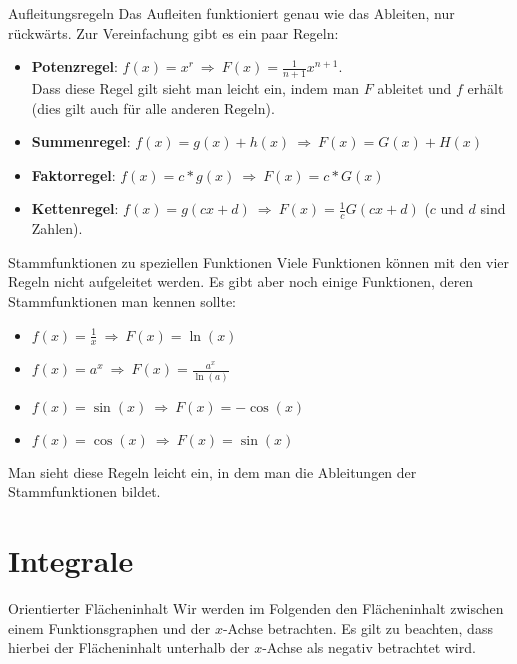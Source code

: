 \begin{bla}{Aufleitungsregeln}
  Das Aufleiten funktioniert genau wie das Ableiten, nur rückwärts. Zur Vereinfachung gibt es ein paar Regeln:
  \begin{itemize}
    \item \textbf{Potenzregel}: $f(x)=x^r\ \Rightarrow\ F(x)=\frac{1}{n+1}x^{n+1}$.\\
    Dass diese Regel gilt sieht man leicht ein, indem man $F$ ableitet und $f$ erhält (dies gilt auch für alle anderen Regeln).

    \item \textbf{Summenregel}: $f(x)=g(x)+h(x)\ \Rightarrow\ F(x)=G(x)+H(x)$

    \item \textbf{Faktorregel}: $f(x)=c*g(x)\  \Rightarrow\  F(x)=c*G(x)$

    \item \textbf{Kettenregel}: $f(x)=g(cx+d)\ \Rightarrow\ F(x)=\frac{1}{c}G(cx+d)$ ($c$ und $d$ sind Zahlen).
  \end{itemize}
\end{bla}

\begin{bla}{Stammfunktionen zu speziellen Funktionen}
  Viele Funktionen können mit den vier Regeln nicht aufgeleitet werden. Es gibt aber noch einige Funktionen, deren Stammfunktionen man kennen sollte:
  \begin{itemize}
    \item $f(x)=\frac{1}{x}\ \Rightarrow\  F(x)=\ln(x)$

    \item $f(x)=a^x\  \Rightarrow\  F(x)=\frac{a^x}{\ln(a)}$

    \item $f(x)=\sin(x)\  \Rightarrow\  F(x)=-\cos(x)$

    \item $f(x)=\cos(x)\  \Rightarrow\  F(x)=\sin(x)$
  \end{itemize}
  Man sieht diese Regeln leicht ein, in dem man die Ableitungen der Stammfunktionen bildet.
\end{bla}

\section{Integrale}

\begin{bla}{Orientierter Flächeninhalt}
  Wir werden im Folgenden den Flächeninhalt zwischen einem Funktionsgraphen und der $x$-Achse betrachten. Es gilt zu beachten, dass hierbei der Flächeninhalt unterhalb der $x$-Achse als negativ betrachtet wird.
\end{bla}

